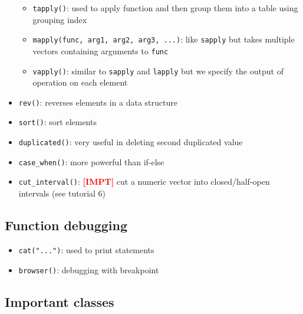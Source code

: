 \documentclass{article}
\newcommand{\impt}[0]{\textcolor{red}{\textbf{[IMPT] }}}
\begin{document}
\begin{multicols}{2}
\begin{itemize}
\begin{itemize}
		\item \texttt{tapply()}: used to apply function and then group them into a table using grouping index
		\item \texttt{mapply(func, arg1, arg2, arg3, ...)}: like \texttt{sapply} but takes multiple vectors containing arguments to \texttt{func}
		\item \texttt{vapply()}: similar to \texttt{sapply} and \texttt{lapply} but we specify the output of operation on each element
	\end{itemize}
    \item \texttt{rev()}: reverses elements in a data structure
    \item \texttt{sort()}: sort elements
    \item \texttt{duplicated()}: very useful in deleting second duplicated value
    \item \texttt{case\_when()}: more powerful than if-else
    \item \texttt{cut\_interval()}: \impt cut a numeric vector into closed/half-open intervals (see tutorial 6)
\end{itemize}
\subsection*{Function debugging}
\begin{itemize}
	\item \texttt{cat("...")}: used to print statements
	\item \texttt{browser()}: debugging with breakpoint
\end{itemize}
\subsection*{Important classes}

\end{multicols}
\end{document}
